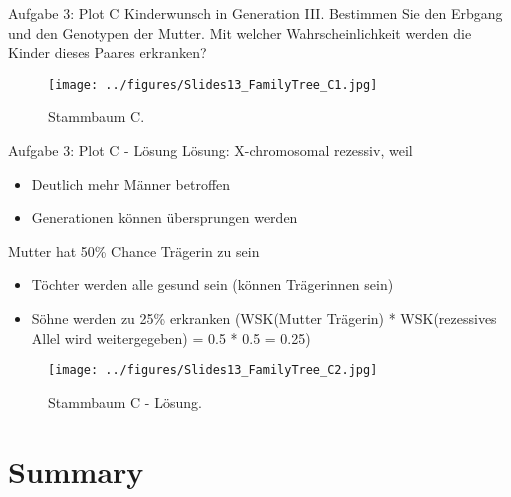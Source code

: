 \documentclass{beamer}
\begin{document}
\begin{frame}{Aufgabe 3: Plot C}
Kinderwunsch in Generation III. Bestimmen Sie den Erbgang und den Genotypen der Mutter. Mit welcher Wahrscheinlichkeit werden die Kinder dieses Paares erkranken?

\begin{figure}[h]
\begin{center}
\texttt{[image: ../figures/Slides13\_FamilyTree\_C1.jpg]}
\caption{Stammbaum C.}
\label{fig:tree_C1}
\end{center}
\end{figure}    
\end{frame}

\begin{frame}{Aufgabe 3: Plot C - Lösung}
Lösung: X-chromosomal rezessiv, weil

\begin{itemize}
    \item Deutlich mehr Männer betroffen
    \item Generationen können übersprungen werden  
\end{itemize}

Mutter hat 50\% Chance Trägerin zu sein

\begin{itemize}
    \item Töchter werden alle gesund sein (können Trägerinnen sein)
    \item Söhne werden zu 25\% erkranken (WSK(Mutter Trägerin) * WSK(rezessives Allel wird weitergegeben) = 0.5 * 0.5 = 0.25)
\end{itemize}

\begin{figure}[h]
\begin{center}
\texttt{[image: ../figures/Slides13\_FamilyTree\_C2.jpg]}
\caption{Stammbaum C - Lösung.}
\label{fig:tree_C2}
\end{center}
\end{figure}    
\end{frame}

\section{Summary}
\end{document}
